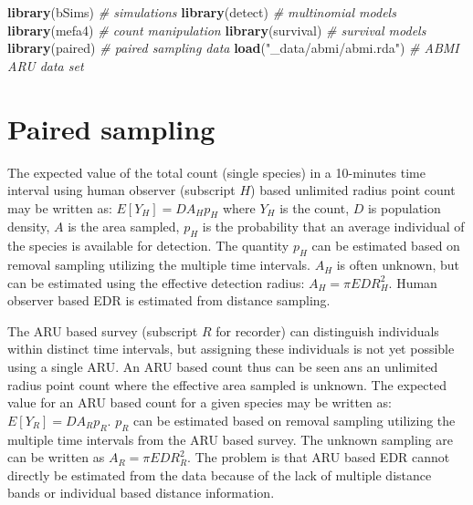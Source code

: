 \documentclass[12pt,]{book}
\newenvironment{Shaded}{\begin{snugshade}}{\end{snugshade}}
\newcommand{\CommentTok}[1]{\textcolor[rgb]{0.56,0.35,0.01}{\textit{#1}}}
\newcommand{\KeywordTok}[1]{\textcolor[rgb]{0.13,0.29,0.53}{\textbf{#1}}}
\newcommand{\NormalTok}[1]{#1}
\newcommand{\StringTok}[1]{\textcolor[rgb]{0.31,0.60,0.02}{#1}}
\begin{document}
\begin{Shaded}
\begin{Highlighting}[]
\KeywordTok{library}\NormalTok{(bSims)                }\CommentTok{# simulations}
\KeywordTok{library}\NormalTok{(detect)               }\CommentTok{# multinomial models}
\KeywordTok{library}\NormalTok{(mefa4)                }\CommentTok{# count manipulation}
\KeywordTok{library}\NormalTok{(survival)             }\CommentTok{# survival models}
\KeywordTok{library}\NormalTok{(paired)               }\CommentTok{# paired sampling data}
\KeywordTok{load}\NormalTok{(}\StringTok{"_data/abmi/abmi.rda"}\NormalTok{)   }\CommentTok{# ABMI ARU data set}
\end{Highlighting}
\end{Shaded}

\hypertarget{paired-sampling}{%
\section{Paired sampling}\label{paired-sampling}}

The expected value of the total count (single species) in a 10-minutes time interval
using human observer (subscript \(H\)) based unlimited radius point count may be written as:
\(E[Y_{H}] = D A_{H} p_{H}\) where \(Y_{H}\) is the count, \(D\) is population density, \(A\) is
the area sampled, \(p_{H}\) is the probability that an average individual of the species
is available for detection. The quantity \(p_{H}\) can be estimated based on removal
sampling utilizing the multiple time intervals. \(A_{H}\) is often unknown, but can
be estimated using the effective detection radius: \(A_{H}=\pi EDR_{H}^2\).
Human observer based EDR is estimated from distance sampling.

The ARU based survey (subscript \(R\) for recorder)
can distinguish individuals within distinct time intervals,
but assigning these individuals is not yet possible using a single ARU.
An ARU based count thus can be seen ans an unlimited radius point count
where the effective area sampled is unknown. The expected value for an
ARU based count for a given species may be written as:
\(E[Y_{R}] = D A_{R} p_{R}\). \(p_{R}\) can be estimated based on removal
sampling utilizing the multiple time intervals from the ARU based survey.
The unknown sampling are can be written as \(A_{R}=\pi EDR_{R}^2\).
The problem is that ARU based EDR cannot directly be estimated from the data
because of the lack of multiple distance bands or individual based distance
information.
\end{document}
